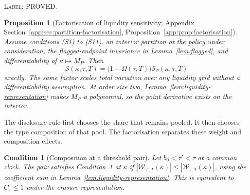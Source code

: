 \documentclass[11pt]{article}
\newtheorem{proposition}{Proposition}
\newtheorem{condition}{Condition}
\newcommand{\Wrev}{\mathcal{W}}
\begin{document}
\noindent\textsc{Label: PROVED.}\par
\begin{proposition}[Factorisation of liquidity sensitivity; Appendix Section~\ref{app:sec:partition-factorisation}, Proposition~\ref{app:prop:factorisation}]
\label{prop:factorisation}
Assume conditions (S1) to (S11), an interior partition at the policy under consideration, the
flagged-endpoint invariance in Lemma~\ref{lem:flagged}, and differentiability of
$\kappa\mapsto M_P$. Then
\begin{equation}
\label{eq:factorisation}
\mathcal S(\kappa,\tau,T)=\bigl(1-\Omega(\tau,T)\bigr)\mathcal S_P(\kappa,\tau,T)
\end{equation}
exactly. The same factor scales total variation over any liquidity grid without a differentiability
assumption. At order size two, Lemma~\ref{lem:liquidity-representation} makes $M_P$ a polynomial, so
the point derivative exists on the interior.
\end{proposition}

The disclosure rule first chooses the share that remains pooled. It then chooses the type
composition of that pool. The factorisation separates these weight and composition effects.

\begin{condition}[Composition at a threshold pair]
\label{cond:D}
Let $b_0<\tau'<\tau$ at a common clock. The pair satisfies Condition~\ref{cond:D} at $\kappa$ if
$|\Wrev_{\tau',T}(\kappa)|\leq|\Wrev_{\tau,T}(\kappa)|$, using the coefficient sum in
Lemma~\ref{lem:liquidity-representation}. This is equivalent to $C_\tau\leq1$ under the erasure
representation.
\end{condition}
\end{document}

